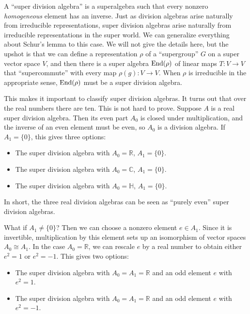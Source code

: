 \documentclass[]{amsart}
\newcommand{\maps}{\colon}    %
\newcommand{\R}{{\mathbb R}}  %
\newcommand{\C}{{\mathbb C}}  %
\renewcommand{\H}{{\mathbb H}}  %
\newcommand{\End}{{\rm End}}
\theoremstyle{definition}
\begin{document}
 A ``super division algebra'' is a superalgebra such that every nonzero \emph{homogeneous} element has an inverse.  Just as division algebras arise naturally from irreducible representations,  super division algebras arise naturally from irreducible representations in the super world.  We can generalize everything about Schur's lemma to this case.  We will not give the details here, but the upshot is that we can define a representation $\rho$ of a ``supergroup'' $G$ on a super vector space $V$, and then there is a super algebra $\End(\rho)$ of linear maps $T \maps V \to V$ that ``supercommute'' with every map $\rho(g) \maps V \to V$.   When $\rho$ is irreducible in the appropriate sense, $\End(\rho)$ must be a super division algebra.   

This makes it important to classify super division algebras.  It turns out that over the real numbers there are ten.  This is not hard to prove.  Suppose $A$ is a real super division algebra.  Then its even part $A_0$ is closed under multiplication, and the inverse of an even element must be even, so $A_0$ is a division algebra.   If $A_1 = \{0\}$, this gives three options:
\begin{itemize}
\item The super division algebra with $A_0 = \R$, $A_1 = \{0\}$.
\item The super division algebra with $A_0 = \C$, $A_1 = \{0\}$.
\item The super division algebra with $A_0 = \H$, $A_1 = \{0\}$.
\end{itemize}
In short, the three real division algebras can be seen as ``purely even'' super division algebras.

What if $A_1 \ne \{0\}$?  Then we can choose a nonzero element $e \in A_1$.  Since 
it is invertible, multiplication by this element sets up an isomorphism of vector spaces
$A_0 \cong A_1$.   In the case $A_0 = \R$, we 
can rescale $e$ by a real number to obtain either $e^2 = 1$ or $e^2 = -1$. 
This gives two options:
\begin{itemize}
\item The super division algebra with $A_0 = A_1 = \R$ and an odd element $e$
with $e^2 = 1$.
\item The super division algebra with $A_0 = A_1 = \R$ and an odd element $e$
with $e^2 = -1$.
\end{itemize}
\end{document}
